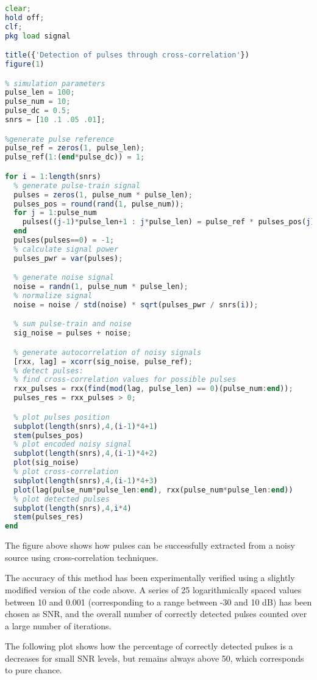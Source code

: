 \begin{lstlisting}[language=Octave]
clear;
hold off;
clf;
pkg load signal

title({'Detection of pulses through cross-correlation'})
figure(1)

% simulation parameters
pulse_len = 100;
pulse_num = 10;
pulse_dc = 0.5;
snrs = [10 .1 .05 .01];

%generate pulse reference
pulse_ref = zeros(1, pulse_len);
pulse_ref(1:(end*pulse_dc)) = 1;

for i = 1:length(snrs)
  % generate pulse-train signal
  pulses = zeros(1, pulse_num * pulse_len);
  pulses_pos = round(rand(1, pulse_num));
  for j = 1:pulse_num
    pulses((j-1)*pulse_len+1 : j*pulse_len) = pulse_ref * pulses_pos(j);
  end
  pulses(pulses==0) = -1;
  % calculate signal power
  pulses_pwr = var(pulses);

  % generate noise signal
  noise = randn(1, pulse_num * pulse_len);
  % normalize signal
  noise = noise / std(noise) * sqrt(pulses_pwr / snrs(i));

  % sum pulse-train and noise
  sig_noise = pulses + noise;

  % generate autocorrelation of noisy signals
  [rxx, lag] = xcorr(sig_noise, pulse_ref);
  % detect pulses:
  % find cross-correlation values for possible pulses
  rxx_pulses = rxx(find(mod(lag, pulse_len) == 0)(pulse_num:end));
  pulses_res = rxx_pulses > 0;

  % plot pulses position
  subplot(length(snrs),4,(i-1)*4+1)
  stem(pulses_pos)
  % plot encoded noisy signal
  subplot(length(snrs),4,(i-1)*4+2)
  plot(sig_noise)
  % plot cross-correlation
  subplot(length(snrs),4,(i-1)*4+3)
  plot(lag(pulse_num*pulse_len:end), rxx(pulse_num*pulse_len:end))
  % plot detected pulses
  subplot(length(snrs),4,i*4)
  stem(pulses_res)
end
\end{lstlisting}

The figure above shows how pulses can be successfully extracted from a noisy source using cross-correlation techniques.

The accuracy of this method has been experimentally verified using a slightly modified version of the code above.
A series of 25 logarithmically spaced values between 10 and 0.001 (corresponding to a range between -30 and 10 dB) has been chosen as SNR, and the overall number of correctly detected pulses counted over a large number of iterations.

The following plot shows how the percentage of correctly detected pulses is a decreases for small SNR levels, but remains always above 50, which corresponds to pure chance.

